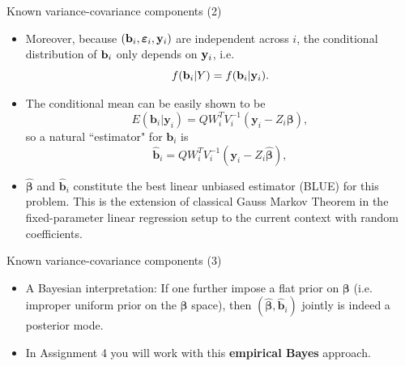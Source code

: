 \documentclass{beamer}
\newcommand{\boldbeta}{{\boldsymbol \beta}}
\newcommand{\boldvarepsilon}{{\boldsymbol \varepsilon}}
\newenvironment{wideitemize}%
  {\begin{itemize}%
    \setlength{\parskip}{1em}}%
  {\end{itemize}}
\begin{document}
\begin{frame} {Known variance-covariance components (2)}

\begin{wideitemize}

\item Moreover, because $({\bf b}_i, \boldvarepsilon_i, {\bf y}_i)$ are independent across $i$, the conditional distribution of ${\bf b}_i$ only depends on ${\bf y}_i$, i.e. 
\[
f(\mathbf{b}_i|Y) = f(\mathbf{b}_i|{\bf y}_i).
\]


\item The conditional mean can be easily shown to be
\begin{equation*}
E(\mathbf{b}_i |\mathbf{y}_i)=QW_i^TV_i^{-1}(\mathbf{y}_i-Z_i \boldbeta),
\end{equation*}
so a natural ``estimator" for ${\mathbf{b}}_i$ is 
\begin{equation}
\hat{\mathbf{b}}_i =QW_i^TV_i^{-1}(\mathbf{y}_i-Z_i \hat{\boldbeta}),
\label{eq-7.1.10}
\end{equation}

\item $\hat{\boldsymbol \beta}$ and $\hat{\mathbf{b}}_i$ constitute the best linear unbiased estimator (BLUE) for this problem.  This is the extension of classical Gauss Markov Theorem in the fixed-parameter linear regression setup to the current context with random coefficients. \cite{harville1976, harville1977}


\end{wideitemize}


\end{frame}



\begin{frame} {Known variance-covariance components (3)}

\begin{wideitemize}



\item A Bayesian interpretation: If one further impose  a flat prior on $\boldsymbol \beta$ (i.e. improper uniform prior on the $\boldsymbol \beta$ space), then $(\hat{\boldsymbol \beta} , \hat{\mathbf{b}}_i)$ jointly is indeed a posterior mode. 


\item In Assignment 4 you will work with this \textbf{empirical Bayes} approach.
\end{wideitemize}


\end{frame}
\end{document}
